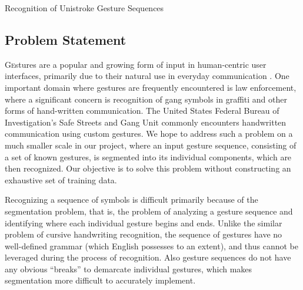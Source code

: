 \documentclass[twoside]{article}
\begin{document}
\centerline{Recognition of Unistroke Gesture Sequences}
\normalsize


\begin{multicols}{2} %

\section{Problem Statement}
\lettrine[nindent=0em,lines=2]{G}estures are a popular and growing form of input
in human-centric user interfaces, primarily due to their natural use in everyday
communication \cite{mitra_gesture_2007}.
One important domain where gestures are frequently encountered is law
enforcement, where a significant concern is recognition of gang symbols in
graffiti and other forms of hand-written communication. The United States
Federal Bureau of Investigation's Safe Streets and Gang Unit commonly encounters
handwritten communication using custom
gestures\cite{lyddane_donald_united_2006}. 
We hope to address such a problem on a much smaller scale in our project, where
an input gesture sequence, consisting of a set of known gestures,
is segmented into its individual components, which are then recognized.
Our objective is to solve this problem without constructing an exhaustive set of training
data.

Recognizing a sequence of symbols is difficult primarily because of the
segmentation problem, that is, the problem of analyzing a gesture sequence and
identifying where each individual gesture begins and ends.
Unlike the similar problem of cursive handwriting recognition, the sequence
of gestures have no well-defined grammar (which English possesses to an extent), and thus cannot be
leveraged during the process of recognition. Also gesture sequences do not have any obvious 
``breaks'' to demarcate individual gestures, which makes segmentation more difficult to accurately
implement.


\end{multicols}
\end{document}
